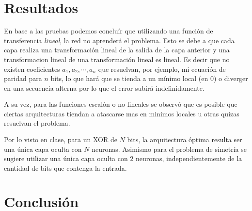 \documentclass[%
    final,
    reprint,
    notitlepage,
    narroweqnarray,
    inline,
    twoside,
    invited
    ]{ieee}
\begin{document}
\section{Resultados}

\par En base a las pruebas podemos concluír que utilizando una función de transferencia \textit{lineal}, la red no aprenderá el problema. Esto se debe a que cada capa realiza una transformación lineal de la salida de la capa anterior y una transformacion lineal de una transformación lineal es lineal. Es decir que no existen coeficientes $a_1, a_2, \cdots, a_n$ que resuelvan, por ejemplo, mi ecuación de paridad para $n$ bits, lo que hará que se tienda a un mínimo local (en 0) o diverger en una secuencia alterna por lo que el error subirá indefinidamente.

\par A su vez, para las funciones escalón o no lineales se observó que es posible que ciertas arquitecturas tiendan a atascarse mas en minimos locales u otras quizas resuelvan el problema.
\par Por lo visto en clase, para un XOR de $N$ bits, la arquitectura óptima resulta ser una única capa oculta con $N$ neuronas. Asimismo para el problema de simetría se sugiere utilizar una única capa oculta con 2 neuronas, independientemente de la cantidad de bits que contenga la entrada.

\section{Conclusión}






\end{document}
